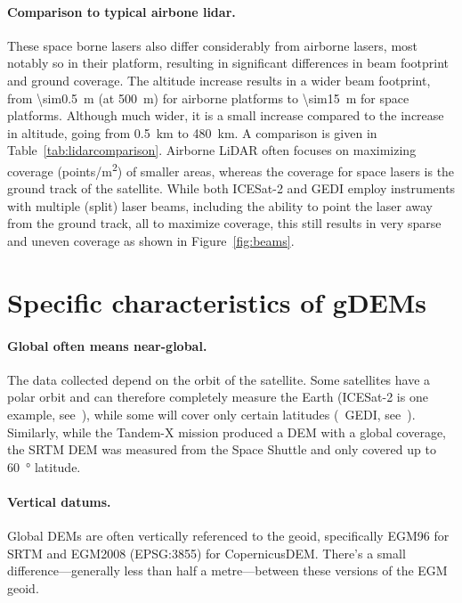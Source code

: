 \paragraph{Comparison to typical airbone lidar.}
These space borne lasers also differ considerably from airborne lasers, most notably so in their platform, resulting in significant differences in beam footprint and ground coverage.
The altitude increase results in a wider beam footprint, from \qty{\sim0.5}{m} (at \qty{500}{m}) for airborne platforms to \qty{\sim15}{m} for space platforms.
Although much wider, it is a small increase compared to the increase in altitude, going from \qty{0.5}{km} to \qty{480}{km}.
A comparison is given in Table~\ref{tab:lidarcomparison}.
Airborne LiDAR often focuses on maximizing coverage (\unit{points/m^2}) of smaller areas, whereas the coverage for space lasers is the ground track of the satellite.
While both ICESat-2 and GEDI employ instruments with multiple (split) laser beams, including the ability to point the laser away from the ground track, all to maximize coverage, this still results in very sparse and uneven coverage as shown in Figure~\ref{fig:beams}.



%
\section[Specific characteristics]{Specific characteristics of gDEMs}

\paragraph{Global often means near-global.}

The data collected depend on the orbit of the satellite.
Some satellites have a polar orbit and can therefore completely measure the Earth (ICESat-2 is one example, see~), while some will cover only certain latitudes (\eg\ GEDI, see~).
Similarly, while the Tandem-X mission produced a DEM with a global coverage, the SRTM DEM was measured from the Space Shuttle and only covered up to \qty{60}{\degree} latitude.


\paragraph{Vertical datums.}
Global DEMs are often vertically referenced to the geoid, specifically EGM96 for SRTM and EGM2008 (EPSG:3855) for CopernicusDEM.
There's a small difference---generally less than half a metre---between these versions of the EGM geoid.

